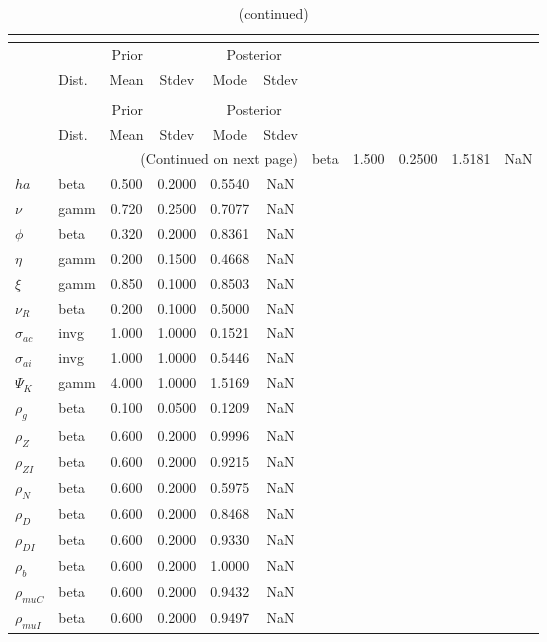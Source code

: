  
\begin{center}
\begin{longtable}{llcccc} 
\caption{Results from posterior maximization (parameters)}\\
 \label{Table:Posterior:1}\\
\toprule 
  & \multicolumn{3}{c}{Prior}  &  \multicolumn{2}{c}{Posterior} \\
  \cmidrule(r{.75em}){2-4} \cmidrule(r{.75em}){5-6}
  & Dist. & Mean  & Stdev & Mode & Stdev \\ 
\midrule \endfirsthead 
\caption{(continued)}\\
 \bottomrule 
  & \multicolumn{3}{c}{Prior}  &  \multicolumn{2}{c}{Posterior} \\
  \cmidrule(r{.75em}){2-4} \cmidrule(r{.75em}){5-6}
  & Dist. & Mean  & Stdev & Mode & Stdev \\ 
\midrule \endhead 
\bottomrule \multicolumn{6}{r}{(Continued on next page)}\endfoot 
\bottomrule\endlastfoot 
${\sigma}$ & beta &   1.500 & 0.2500 &   1.5181 &     NaN \\ 
${ha}$ & beta &   0.500 & 0.2000 &   0.5540 &     NaN \\ 
$\nu$ & gamm &   0.720 & 0.2500 &   0.7077 &     NaN \\ 
${\phi}$ & beta &   0.320 & 0.2000 &   0.8361 &     NaN \\ 
${\eta}$ & gamm &   0.200 & 0.1500 &   0.4668 &     NaN \\ 
$\xi$ & gamm &   0.850 & 0.1000 &   0.8503 &     NaN \\ 
${\nu_R}$ & beta &   0.200 & 0.1000 &   0.5000 &     NaN \\ 
${\sigma_{ac}}$ & invg &   1.000 & 1.0000 &   0.1521 &     NaN \\ 
${\sigma_{ai}}$ & invg &   1.000 & 1.0000 &   0.5446 &     NaN \\ 
${\Psi_{K}}$ & gamm &   4.000 & 1.0000 &   1.5169 &     NaN \\ 
${\rho_g}$ & beta &   0.100 & 0.0500 &   0.1209 &     NaN \\ 
${\rho_Z}$ & beta &   0.600 & 0.2000 &   0.9996 &     NaN \\ 
${\rho_{ZI}}$ & beta &   0.600 & 0.2000 &   0.9215 &     NaN \\ 
${\rho_N}$ & beta &   0.600 & 0.2000 &   0.5975 &     NaN \\ 
${\rho_D}$ & beta &   0.600 & 0.2000 &   0.8468 &     NaN \\ 
${\rho_{DI}}$ & beta &   0.600 & 0.2000 &   0.9330 &     NaN \\ 
${\rho_b}$ & beta &   0.600 & 0.2000 &   1.0000 &     NaN \\ 
${\rho_{muC}}$ & beta &   0.600 & 0.2000 &   0.9432 &     NaN \\ 
${\rho_{muI}}$ & beta &   0.600 & 0.2000 &   0.9497 &     NaN \\ 
\end{longtable}
 \end{center}
